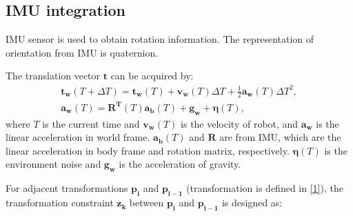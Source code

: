\documentclass[journal]{IEEEtran}
\begin{document}
\subsection{IMU integration}
IMU sensor \cite{Anonymous:uDLQ94uT} is used to obtain rotation information. The representation of orientation from IMU is quaternion.

The translation vector $\mathbf{t}$ can be acquired by: 
\begin{equation}\label{29}
\begin{array}{ll}
\mathbf{t_w}(T+\Delta T) = \mathbf{t_w}(T) + \mathbf{v_w}(T)\Delta T + \frac{1}{2}\mathbf{a_w}(T)\Delta T^{2}, 
\\\mathbf{a_w}(T) = \mathbf{R^{T}}(T) \mathbf{a_b}(T) + \mathbf{g_w} + \mathbf{\eta}(T),
\end{array}
\end{equation}
where $T$ is the current time and $\mathbf{v_w}(T)$ is the velocity of robot, and $\mathbf{a_w}$ is the linear acceleration in world frame. $\mathbf{a_b}(T)$ and $\mathbf{R}$ are from IMU, which are the linear acceleration in body frame and rotation matrix, respectively. $\mathbf{\eta}(T)$ is the environment noise and $\mathbf{g_w}$ is the acceleration of gravity. 

For adjacent transformations $\mathbf{p_i}$ and $\mathbf{p_{i-1}}$ (transformation is defined in \eqref{1}), the transformation constraint $\mathbf {{z}_{k}}$ between $\mathbf{p_i}$ and $\mathbf{p_{i-1}}$ is designed as:
\end{document}
